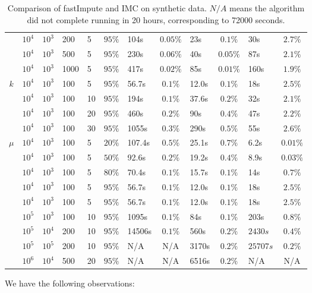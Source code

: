 \documentclass[twoside,11pt]{article}
\begin{document}
\begin{table}[ht!]
\begin{tabular}{|c|l|l|l|l|l||l|c|l|c|l|c|}
	&$10^4$ & $10^3$& 200 & 5 & $95\%$ & 104s&$0.05\%$ & 23s&$0.1\%$ & 30s &$2.7\%$ \\
	&$10^4$ & $10^3$& 500 & 5 & $95\%$ & 230s &$0.06\%$& 40s &$0.05\%$ & 87s & $2.1\%$  \\
	&$10^4$ & $10^3$& 1000 & 5 & $95\%$ & 417s &$0.02\%$ & 85s &$0.01\%$ & 160s & $1.9\%$  \\\hline\hline
	\multirow{4}{*}{$k$}	&$10^4$ & $10^3$& 100& 5 & $95\%$ & 56.7s&$0.1\%$& 12.0s&$0.1\%$ & 18s&$2.5\%$ \\
	&	$10^4$ & $10^3$& 100 & 10 & $95\%$ & 194s&$0.1\%$& 37.6s&$0.2\%$ &32s & $2.1\%$\\
&	$10^4$ & $10^3$ & 100& 20 & $95\%$ & 460s&$0.2\%$& 90s&$0.4\%$ &47s & $2.2\%$\\
	&	$10^4$ & $10^3$& 100  & 30 & $95\%$ & 1055s &$0.3\%$ & 290s &$0.5\%$ &55s & $2.6\%$\\\hline\hline
\multirow{4}{*}{$\mu$} &	$10^4$ & $10^3$& 100 & 5 & $20\%$  & 107.4s &$0.5\%$& 25.1s &$0.7\%$ & 6.2s & $0.01\%$ \\
	&$10^4$ & $10^3$& 100 & 5 & $50\%$ & 92.6s &$0.2\%$& 19.2s &$0.4\%$ &8.9s & $0.03\%$ \\
	&$10^4$ & $10^3$& 100 & 5 & $80\%$ & 70.4s&$0.1\%$ & 15.7s&$0.1\%$ &14s & $0.7\%$\\
	&$10^4$ & $10^3$& 100& 5 & $95\%$ & 56.7s&$0.1\%$ & 12.0s&$0.1\%$ & 18s&$2.5\%$ \\\hline\hline
	&$10^4$ & $10^3$& 100& 5 & $95\%$ & 56.7s&$0.1\%$& 12.0s&$0.1\%$ & 18s&$2.5\%$ \\
	&$10^5$ & $10^3$& 100& 10 & $95\%$ & 1095s &$0.1\%$& 84s &$0.1\%$ & 203s & $0.8\%$\\
	&$10^5$ & $10^4$& 200& 10 & $95\%$ & 14506s &$0.1\%$ & 560s &$0.2\%$ &$2430s$ &$0.4\%$\\
	&$10^5$ & $10^5$& 200& 10 & $95\%$ & N/A & N/A & 3170s &$0.2\%$ &$25707s$ & $0.2\%$ \\
	&$10^6$ & $10^4$& 500& 20 & $95\%$ & N/A & N/A & 6516s &$0.2\%$ & N/A & N/A \\\hline\hline
\end{tabular}
\caption{Comparison of fastImpute and IMC on synthetic data.  $N/A$ means the algorithm did not complete running in 20 hours, corresponding to 72000 seconds. }
\end{table}
We have the following observations:
\end{document}
